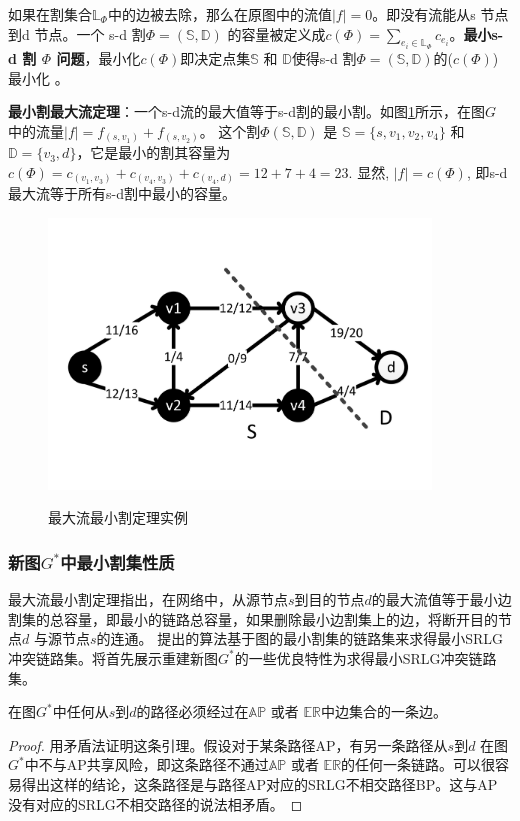 如果在割集合$\mathbb{\mathbb{L}}_{\Phi}$中的边被去除，那么在原图中的流值$|f| = 0$。即没有流能从s 节点到d 节点。一个 s-d 割${\Phi}=(\mathbb{S},\mathbb{D})$ 的容量被定义成$c(\Phi)=\sum\limits_{e_i\in \mathbb{\mathbb{L}}_{\Phi}}c_{e_i}$。\textbf{最小s-d 割 $\Phi$ 问题}，最小化$c(\Phi)$即决定点集$\mathbb{S}$ 和 $\mathbb{D}$使得s-d 割${\Phi}=(\mathbb{S},\mathbb{D})$的($c(\Phi)$) 最小化 。

\textbf{最小割最大流定理}：一个s-d流的最大值等于s-d割的最小割。如图\ref{fig:FlowNetwork}所示，在图$G$ 中的流量$|f|=f_{(s,v_1)}+f_{(s,v_2)}$。 这个割$\Phi(\mathbb{S},\mathbb{D})$ 是 $\mathbb{S}=\{s,v_1,v_2,v_4\}$ 和$\mathbb{D}=\{v_3,d\}$，它是最小的割其容量为$c(\Phi)=c_{(v_1,v_3)}+c_{(v_4,v_3)}+c_{(v_4,d)}=12+7+4=23$. 显然, $|f|=c(\Phi)$, 即s-d 最大流等于所有s-d割中最小的容量。
\begin{figure}[htbp]
  \centering
  \includegraphics[width=4.0in]{figures/FlowNetwork}\\
  \caption{最大流最小割定理实例}
  \label{fig:FlowNetwork}
\end{figure}

\subsubsection{新图$G^*$中最小割集性质}
最大流最小割定理指出，在网络中，从源节点$s$到目的节点$d$的最大流值等于最小边割集的总容量，即最小的链路总容量，如果删除最小边割集上的边，将断开目的节点$d$ 与源节点$s$的连通。 提出的算法基于图的最小割集的链路集来求得最小SRLG 冲突链路集。将首先展示重建新图$G^*$的一些优良特性为求得最小SRLG冲突链路集。

\begin{lemma}
\label{le:lemma1}
    在图$G^*$中任何从$s$到$d$的路径必须经过在$\mathbb{AP}$ 或者 $\mathbb{\mathbb{ER}}$中边集合的一条边。
\end{lemma}
\begin{proof}
用矛盾法证明这条引理。假设对于某条路径AP，有另一条路径从$s$到$d$ 在图$G^*$中不与AP共享风险，即这条路径不通过$\mathbb{AP}$ 或者 $\mathbb{\mathbb{ER}}$的任何一条链路。可以很容易得出这样的结论，这条路径是与路径AP对应的SRLG不相交路径BP。这与AP 没有对应的SRLG不相交路径的说法相矛盾。
\end{proof}

